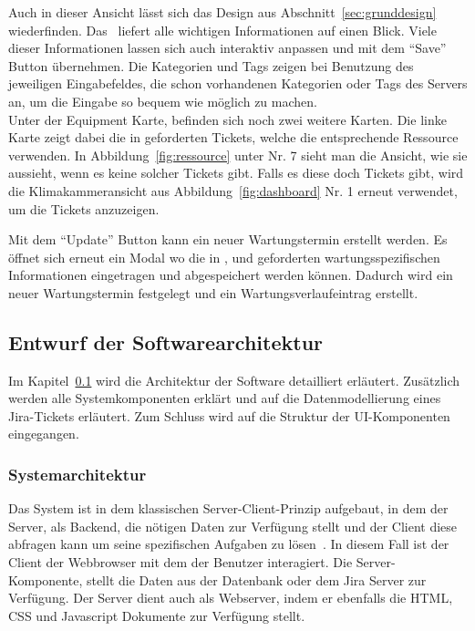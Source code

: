 Auch in dieser Ansicht lässt sich das Design aus Abschnitt~\ref{sec:grunddesign}
wiederfinden. Das~ liefert alle wichtigen Informationen
auf einen Blick. Viele dieser Informationen lassen sich auch interaktiv anpassen
und mit dem ``Save'' Button übernehmen. Die Kategorien und Tags zeigen bei Benutzung
des jeweiligen Eingabefeldes, die schon vorhandenen Kategorien oder Tags des Servers
an, um die Eingabe so bequem wie möglich zu machen. \\

Unter der Equipment Karte, befinden sich noch zwei weitere Karten. Die linke Karte
zeigt dabei die in  geforderten Tickets, welche die 
entsprechende Ressource verwenden. In Abbildung~\ref{fig:ressource} unter Nr. 7 sieht man die Ansicht,
wie sie aussieht, wenn es keine solcher Tickets gibt. Falls es diese doch Tickets gibt, 
wird die Klimakammeransicht aus Abbildung~\ref{fig:dashboard} Nr. 1 erneut verwendet,
um die Tickets anzuzeigen.

Mit dem ``Update'' Button kann ein neuer Wartungstermin erstellt werden.
Es öffnet sich erneut ein Modal wo die in , 
 und  geforderten wartungsspezifischen
Informationen eingetragen und abgespeichert werden können. Dadurch wird ein neuer
Wartungstermin festgelegt und ein Wartungsverlaufeintrag erstellt.


\subsection{Entwurf der Softwarearchitektur}\label{sec:swArchitectur}
Im Kapitel~\ref{sec:swArchitectur} wird die Architektur der Software detailliert 
erläutert. Zusätzlich werden alle Systemkomponenten erklärt und auf die 
Datenmodellierung eines Jira-Tickets erläutert. Zum Schluss wird auf die Struktur
der \gls{UI}-Komponenten eingegangen.

\subsubsection{Systemarchitektur}
Das System ist in dem klassischen Server-Client-Prinzip aufgebaut, in dem der Server, 
als \gls{Backend}, die nötigen Daten zur Verfügung stellt und der Client diese 
abfragen kann um seine spezifischen Aufgaben zu lösen~\cite{Nie13}.
In diesem Fall ist der Client der Webbrowser mit dem der Benutzer interagiert. 
Die Server-Komponente, stellt die Daten aus der Datenbank oder dem \gls{Jira} Server
zur Verfügung. Der Server dient auch als Webserver, indem er ebenfalls die
\gls{HTML}, \gls{CSS} und Javascript Dokumente zur Verfügung stellt.\\

